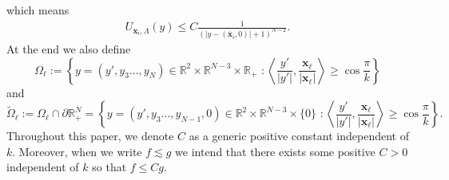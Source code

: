 \documentclass[11pt,a4paper]{amsart}
\begin{document}
which means
\begin{align*}
  U_{\mathbf{x}_i,\Lambda}(y)\leq C\frac{1}{{(\left|y - \left(\bar{\mathbf{x}}_i, 0\right)\right| + 1)}^{N-2}}.
\end{align*}
At the end we also define
$$\Omega_\ell:=\left\{ y=(y',y_3\ldots, y_N)\in \mathbb R^2\times \mathbb R^{N-3}\times \mathbb R_+\,\,: \left\langle \frac{y'}{|y'|}, \frac{ \mathbf{x}_\ell}{|\mathbf{x}_\ell|}\right\rangle\geq \cos\frac\pi k\right\}$$ and 
$$\widetilde\Omega_\ell:=\Omega_\ell\cap\partial\mathbb R^N_+=\left\{ y=(y',y_3\ldots,y_{N-1}, 0)\in \mathbb R^2\times \mathbb R^{N-3}\times \{0\}\,\,: \left\langle \frac{y'}{|y'|}, \frac{ \mathbf{x}_\ell}{|\mathbf{x}_\ell|}\right\rangle\geq \cos\frac\pi k\right\}.$$
 Throughout this paper, we denote $C$ as a generic positive constant independent of $k$. Moreover, when we write $f\lesssim g$ we intend that there exists some positive $C>0$ independent of $k$ so that $f\leq C g$.
\end{document}
